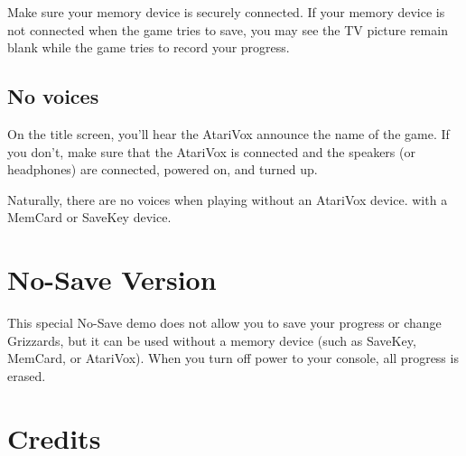 \documentclass[10pt,twocolumn,openany,article]{memoir}
\begin{document}
Make  sure your  memory device  is  securely connected.  If your  memory
device is not connected when the game  tries to save, you may see the TV
picture remain blank while the game tries to record your progress.

\fi

\section*{No voices}

On the title  screen, you'll hear the AtariVox announce  the name of the
game. If  you don't, make  sure that the  AtariVox is connected  and the
speakers (or headphones) are connected, powered on, and turned up.

Naturally,  there are  no  voices  when playing  \ifdefined\ATARIAGESAVE
without an AtariVox device. \else with a MemCard or SaveKey device. \fi

\fi

\ifdefined\NOSAVE

\columnbreak
\chapter{No-Save Version}

This special  No-Save demo does not  allow you to save  your progress or
change Grizzards,  but it can be  used without a memory  device (such as
SaveKey, MemCard, or AtariVox). When you turn off power to your console,
all progress is erased.

\fi

\fi %

\pagebreak
\chapter{Credits}
\end{document}

